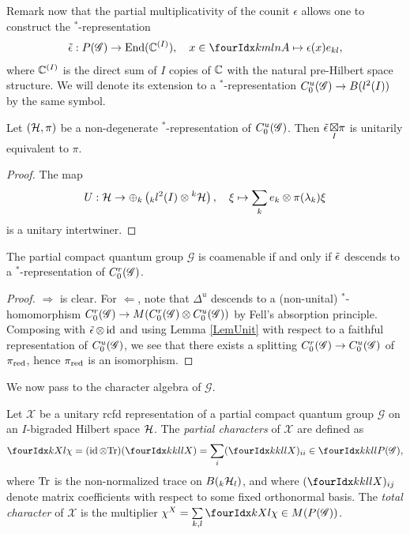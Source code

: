 Remark now that the partial multiplicativity of the counit $\epsilon$ allows one to construct the $^*$-representation 
\begin{align} \label{eq:weps}
  \weps: P(\mathscr{G}) \rightarrow \End(\C^{(I)}), \quad x\in
  \Gr{A}{k}{l}{m}{n}\mapsto \epsilon(x) e_{kl},
\end{align}
where $\mathbb{C}^{(I)}$ is the direct sum of $I$ copies of $\mathbb{C}$ with the natural pre-Hilbert space structure. We will denote its extension to a $^*$-representation $C^{u}_{0}(\mathscr{G})\rightarrow B(l^2(I))$ by the same symbol.

\begin{Lem}\label{LemUnit} Let $(\mathcal{H},\pi)$ be a non-degenerate $^*$-representation of $C^{u}_{0}(\mathscr{G})$. Then $\operatorname{\tilde{\epsilon}}\underset{I}{\boxtimes} \pi$ is unitarily equivalent to $\pi$.
\end{Lem} 
\begin{proof} The map \[U: \mathcal{H} \rightarrow \oplus_k \left({}_kl^2(I)\otimes {}^k\mathcal{H}\right),\quad \xi \mapsto \sum_k e_k\otimes \pi(\lambda_k)\xi\] is a unitary intertwiner.
\end{proof} 

\begin{Prop} The partial compact quantum group $\mathscr{G}$ is coamenable if and only if $\operatorname{\tilde{\epsilon}}$ descends to a $^*$-representation of $C^{r}_{0}(\mathscr{G})$.
\end{Prop} 
\begin{proof} $\Rightarrow$ is clear. For $\Leftarrow$, note that $\Delta^u$ descends to a (non-unital) $^*$-homomorphism $C^{r}_{0}(\mathscr{G})\rightarrow M(C^{r}_{0}(\mathscr{G})\otimes C^{u}_{0}(\mathscr{G}))$ by Fell's absorption principle. Composing with $\operatorname{\tilde{\epsilon}}\otimes \operatorname{id}$ and using Lemma \ref{LemUnit} with respect to a faithful representation of $C^{u}_{0}(\mathscr{G})$, we see that there exists a splitting $C^{r}_{0}(\mathscr{G})\rightarrow C^{u}_{0}(\mathscr{G})$ of $\pi_{\operatorname{\mathrm{red}}}$, hence $\pi_{\operatorname{\mathrm{red}}}$ is an isomorphism.
\end{proof}
 
We now pass to the character algebra of $\mathscr{G}$.
 
 \begin{Def} Let $\mathscr{X}$ be a unitary rcfd representation of a partial compact quantum group $\mathscr{G}$ on an $I$-bigraded Hilbert space $\mathcal{H}$. The \emph{partial characters} of $\mathscr{X}$ are defined as \[\Gr{\chi}{}{X}{k}{l} = (\id\otimes \Tr)(\Gr{X}{k}{l}{k}{l}) = \sum_i(\Gr{X}{k}{l}{k}{l})_{ii} \in \Gr{P(\mathscr{G})}{k}{l}{k}{l},\] where $\mathrm{Tr}$ is the non-normalized trace on $B({}_{k}\mathcal{H}_{l})$, and where $(\Gr{X}{k}{l}{k}{l})_{ij}$ denote matrix coefficients with respect to some fixed orthonormal basis. The \emph{total character} of $\mathscr{X}$ is the multiplier $\chi^X  =\underset{k,l}{\sum} \,\Gr{\chi}{}{X}{k}{l}\in M(P(\mathscr{G}))$.
 \end{Def}

